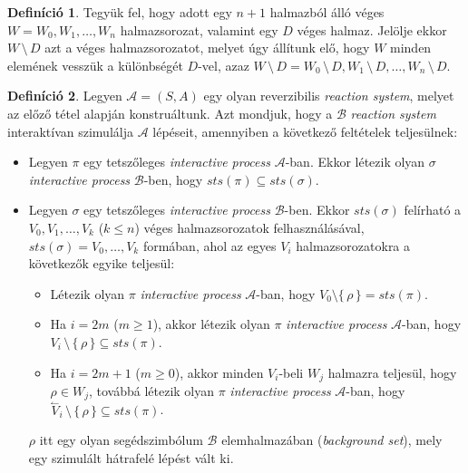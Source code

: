 \documentclass[12pt]{article}
\theoremstyle{definition}
\newtheorem*{definition*}{Definíció}
\theoremstyle{remark}
\theoremstyle{plain}
\theoremstyle{plain}
\newcommand{\backwardhat}{\overset{\leftharpoonup}}
\begin{document}
    \begin{definition*}
        Tegyük fel, hogy adott egy $n + 1$ halmazból álló véges $W=W_{0}, W_{1}, \ldots, W_{n}$ halmazsorozat, valamint egy $D$ véges halmaz. Jelölje ekkor $W \,\setminus\, D$ azt a véges halmazsorozatot, melyet úgy állítunk elő, hogy $W$ minden elemének vesszük a különbségét $D$-vel, azaz $W \,\setminus\, D = W_{0} \,\setminus\, D, W_{1} \,\setminus\, D, \ldots, W_{n} \,\setminus\, D$.
    \end{definition*}

    \begin{definition*}
        Legyen $\mathscr{A}=(S, A)$ egy olyan reverzibilis \textit{reaction system}, melyet az előző tétel alapján konstruáltunk. Azt mondjuk, hogy a $\mathscr{B}$ \textit{reaction system} interaktívan szimulálja $\mathscr{A}$ lépéseit, amennyiben a következő feltételek teljesülnek:
        \begin{itemize}
            \item
            Legyen $\pi$ egy tetszőleges \textit{interactive process} $\mathscr{A}$-ban. Ekkor létezik olyan $\sigma$ \textit{interactive process} $\mathscr{B}$-ben, hogy $\textit{sts}(\pi) \subseteq \textit{sts}(\sigma)$.

            \item
            Legyen $\sigma$ egy tetszőleges \textit{interactive process} $\mathscr{B}$-ben. Ekkor $\textit{sts}(\sigma)$ felírható a $V_{0}, V_{1}, \ldots, V_{k}$ ($k \leq n$) véges halmazsorozatok felhasználásával, $\textit{sts}(\sigma)=V_{0}, \ldots, V_{k}$ formában, ahol az egyes $V_{i}$ halmazsorozatokra a következők egyike teljesül:
            \begin{itemize}
                \item
                Létezik olyan $\pi$ \textit{interactive process} $\mathscr{A}$-ban, hogy $V_{0} \setminus \{ \, \rho \, \} = \textit{sts}(\pi)$.
                
                \item
                Ha $i = 2m$ ($m \geq 1$), akkor létezik olyan $\pi$ \textit{interactive process} $\mathscr{A}$-ban, hogy $V_{i} \,\setminus\, \{ \, \rho \, \}\subseteq \textit{sts}(\pi)$. 
                
                \item
                Ha $i = 2m + 1$ ($m \geq 0$), akkor minden $V_{i}$-beli $W_{j}$ halmazra teljesül, hogy $\rho \in W_{j}$, továbbá létezik olyan $\pi$ \textit{interactive process} $\mathscr{A}$-ban, hogy $\backwardhat V_{i} \,\setminus\, \{ \, \rho \, \} \subseteq \textit{sts}(\pi)$.
            \end{itemize}
            $\rho$ itt egy olyan segédszimbólum $\mathscr{B}$ elemhalmazában (\textit{background set}), mely egy szimulált hátrafelé lépést vált ki.
        \end{itemize}
        
    \end{definition*}
\end{document}
